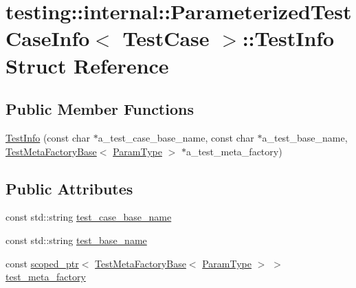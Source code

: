 \hypertarget{structtesting_1_1internal_1_1_parameterized_test_case_info_1_1_test_info}{}\section{testing\+::internal\+::Parameterized\+Test\+Case\+Info$<$ Test\+Case $>$\+::Test\+Info Struct Reference}
\label{structtesting_1_1internal_1_1_parameterized_test_case_info_1_1_test_info}
\subsection*{Public Member Functions}
\begin{DoxyCompactItemize}
\item 
\mbox{\hyperlink{structtesting_1_1internal_1_1_parameterized_test_case_info_1_1_test_info_a97780f3a9b145f30d6803ea7b76abe19}{Test\+Info}} (const char $\ast$a\+\_\+test\+\_\+case\+\_\+base\+\_\+name, const char $\ast$a\+\_\+test\+\_\+base\+\_\+name, \mbox{\hyperlink{classtesting_1_1internal_1_1_test_meta_factory_base}{Test\+Meta\+Factory\+Base}}$<$ \mbox{\hyperlink{classtesting_1_1internal_1_1_parameterized_test_case_info_a643a87e178bf92a4246ce21054e44b96}{Param\+Type}} $>$ $\ast$a\+\_\+test\+\_\+meta\+\_\+factory)
\end{DoxyCompactItemize}
\subsection*{Public Attributes}
\begin{DoxyCompactItemize}
\item 
const std\+::string \mbox{\hyperlink{structtesting_1_1internal_1_1_parameterized_test_case_info_1_1_test_info_a8e435bff3fb74db341a9d0507ceda206}{test\+\_\+case\+\_\+base\+\_\+name}}
\item 
const std\+::string \mbox{\hyperlink{structtesting_1_1internal_1_1_parameterized_test_case_info_1_1_test_info_ab4be52255b150703b450d8ea7c8ab763}{test\+\_\+base\+\_\+name}}
\item 
const \mbox{\hyperlink{classtesting_1_1internal_1_1scoped__ptr}{scoped\+\_\+ptr}}$<$ \mbox{\hyperlink{classtesting_1_1internal_1_1_test_meta_factory_base}{Test\+Meta\+Factory\+Base}}$<$ \mbox{\hyperlink{classtesting_1_1internal_1_1_parameterized_test_case_info_a643a87e178bf92a4246ce21054e44b96}{Param\+Type}} $>$ $>$ \mbox{\hyperlink{structtesting_1_1internal_1_1_parameterized_test_case_info_1_1_test_info_a32a186af685ff14968d62587fb265a37}{test\+\_\+meta\+\_\+factory}}
\end{DoxyCompactItemize}


